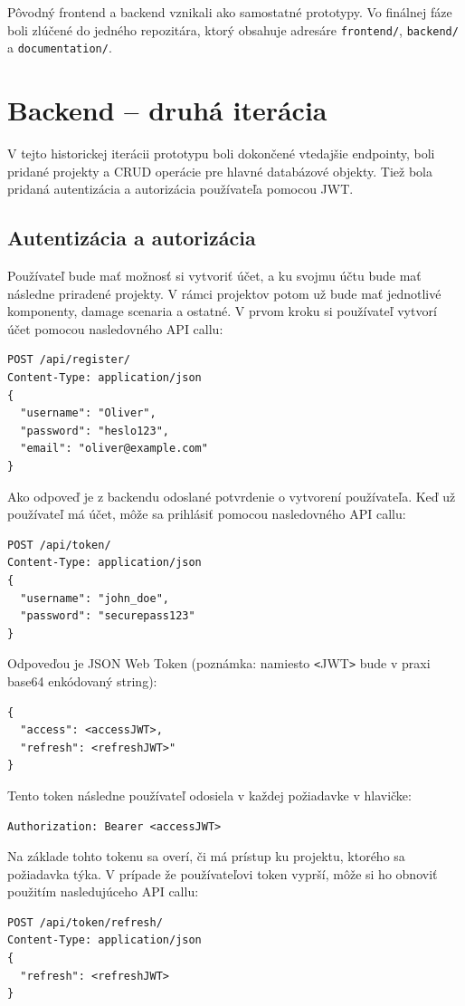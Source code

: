 \documentclass[11pt]{article}
\begin{document}
Pôvodný frontend a backend vznikali ako samostatné prototypy. Vo finálnej fáze boli zlúčené do jedného repozitára, ktorý obsahuje adresáre \texttt{frontend/}, \texttt{backend/} a \texttt{documentation/}.

\section[Backend -~druhá iterácia]{Backend -- druhá iterácia}
V tejto historickej iterácii prototypu boli dokončené vtedajšie endpointy, boli pridané projekty a CRUD operácie pre hlavné databázové objekty. Tiež bola pridaná autentizácia a autorizácia používateľa pomocou JWT.

\subsection{Autentizácia a autorizácia}
Používateľ bude mať možnosť si vytvoriť účet, a ku svojmu účtu bude mať následne priradené projekty. V rámci projektov potom už bude mať jednotlivé komponenty, damage scenaria a ostatné. V prvom kroku si používateľ vytvorí účet pomocou nasledovného API callu:

\begin{verbatim}
POST /api/register/
Content-Type: application/json
{
  "username": "Oliver",
  "password": "heslo123",
  "email": "oliver@example.com"
}
\end{verbatim}
Ako odpoveď je z backendu odoslané potvrdenie o vytvorení používateľa. Keď už používateľ má účet, môže sa prihlásiť pomocou nasledovného API callu:
\begin{verbatim}
POST /api/token/
Content-Type: application/json
{
  "username": "john_doe",
  "password": "securepass123"
}
\end{verbatim}
Odpoveďou je JSON Web Token (poznámka: namiesto \verb|<|JWT\verb|>| bude v praxi base64 enkódovaný string):
\begin{verbatim}
{
  "access": <accessJWT>,
  "refresh": <refreshJWT>"
}
\end{verbatim}
Tento token následne používateľ odosiela v každej požiadavke v hlavičke:
\begin{verbatim}
Authorization: Bearer <accessJWT>
\end{verbatim}
Na základe tohto tokenu sa overí, či má prístup ku projektu, ktorého sa požiadavka týka. V prípade že používateľovi token vyprší, môže si ho obnoviť použitím nasledujúceho API callu:
\begin{verbatim}
POST /api/token/refresh/
Content-Type: application/json
{
  "refresh": <refreshJWT>
}
\end{verbatim}
\end{document}
